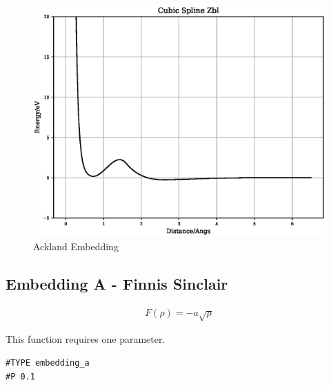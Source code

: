 \FloatBarrier
\begin{figure}[h]
  \begin{center}
    \includegraphics[scale=0.5]{appendix/functions/plots/cubic_spline_zbl_2.eps}
    \caption{Ackland Embedding}
    \label{graph:graph1}
  \end{center}
\end{figure}
\FloatBarrier




\subsection{Embedding A - Finnis Sinclair}

\begin{equation}
\begin{split}
F(\rho) = -a \sqrt{\rho}
\end{split}
\label{eq:finnisSinclair}
\end{equation}

This function requires one parameter\cite{finnissinclair}.

\begin{lstlisting}[style=pseudocode,caption={Embedding A}]
#TYPE embedding_a
#P 0.1
\end{lstlisting}

